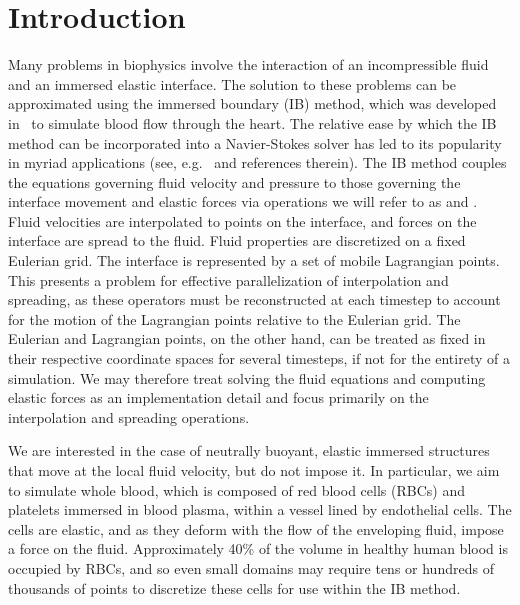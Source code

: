 \section{Introduction}

Many problems in biophysics involve the interaction of an incompressible fluid and an
immersed elastic interface. The solution to these problems can be approximated using the
immersed boundary (IB) method, which was developed in~\cite{Peskin:1972wa} to simulate
blood flow through the heart. The relative ease by which the IB method can be
incorporated into a Navier-Stokes solver has led to its popularity in myriad applications
(see, e.g.~\cite{Iaccarino:2005ii,Griffith:2020hi} and references therein). The IB method
couples the equations governing fluid velocity and pressure to those governing the
interface movement and elastic forces via operations we will refer to as
 and . Fluid velocities are interpolated to points on
the interface, and forces on the interface are spread to the fluid. Fluid properties are
discretized on a fixed Eulerian grid. The interface is represented by a set of mobile
Lagrangian points. This presents a problem for effective parallelization of interpolation
and spreading, as these operators must be reconstructed at each timestep to account for
the motion of the Lagrangian points relative to the Eulerian grid. The Eulerian and
Lagrangian points, on the other hand, can be treated as fixed in their respective
coordinate spaces for several timesteps, if not for the entirety of a simulation. We may
therefore treat solving the fluid equations and computing elastic forces as an
implementation detail and focus primarily on the interpolation and spreading operations.

We are interested in the case of neutrally buoyant, elastic immersed structures that move
at the local fluid velocity, but do not impose it. In particular, we aim to simulate
whole blood, which is composed of red blood cells (RBCs) and platelets immersed in blood
plasma, within a vessel lined by endothelial cells. The cells are elastic, and as they
deform with the flow of the enveloping fluid, impose a force on the fluid. Approximately
40\% of the volume in healthy human blood is occupied by RBCs, and so even small domains
may require tens or hundreds of thousands of points to discretize these cells for use
within the IB method.

